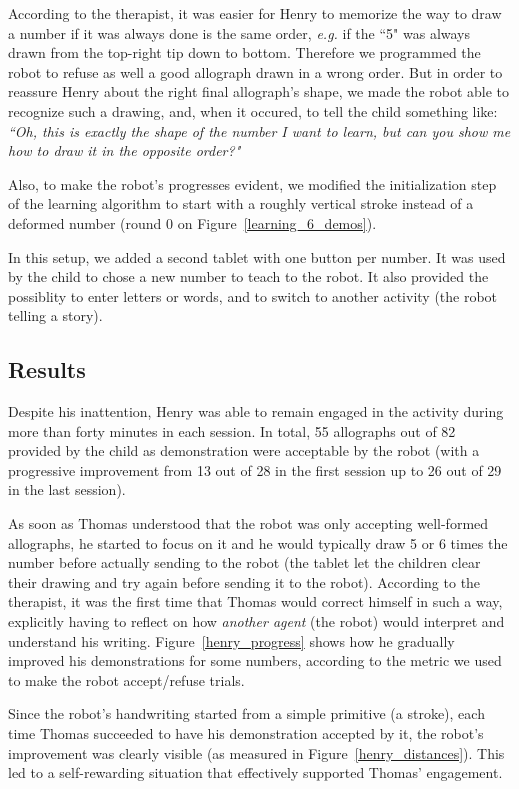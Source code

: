 \documentclass{sig-alternate}
\begin{document}
According to the therapist, it was easier for Henry to memorize the way to draw
a number if it was always done is the same order, \emph{e.g.} if the ``5" was always
drawn from the top-right tip down to bottom. Therefore we programmed the robot to
refuse as well a good allograph drawn in a wrong order. But in order to reassure Henry
about the right final allograph's shape, we made the robot able to recognize
such a drawing, and, when it occured, to tell the child something like:
\emph{``Oh, this is exactly the shape of the number I want to learn, but can you
show me how to draw it in the opposite order?"}

Also, to make
the robot's progresses evident, we modified the initialization step of the
learning algorithm to start with a roughly vertical stroke instead of a
deformed number (round 0 on Figure~\ref{learning_6_demos}).

In this setup, we added a second tablet with one button per number. It was used
by the child to chose a new number to teach to the robot. It also provided the
possiblity to enter letters or words, and to switch to another activity (the
robot telling a story).


\subsection{Results}
Despite his inattention, Henry was able to remain engaged in the activity during more than
forty minutes in each session. In total, 55 allographs out of 82 
provided by the child as demonstration were acceptable by the robot (with a
progressive improvement from 13 out of 28 in the first session up to 26 out
of 29 in the last session).

As soon as Thomas understood that the robot was only accepting well-formed
allographs, he started to focus on it and he would typically draw 5 or 6 times
the number before actually sending to the robot (the tablet let the children
clear their drawing and try again before sending it to the robot). According to
the therapist, it was the first time that Thomas would correct himself in such a
way, explicitly having to reflect on how \emph{another agent} (the robot) would
interpret and understand his writing. Figure~\ref{henry_progress} shows how
he gradually improved his demonstrations for some numbers, according to the
metric we used to make the robot accept/refuse trials.

Since the robot's handwriting started from a simple primitive (a stroke), each
time Thomas succeeded to have his demonstration accepted by it, the robot's
improvement was clearly visible (as measured in Figure~\ref{henry_distances}).
This led to a self-rewarding situation that effectively supported Thomas'
engagement.
\end{document}

